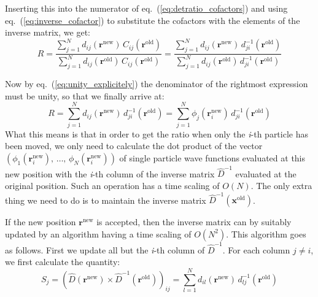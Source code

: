 \documentclass[graybox,sectrefs,envcountresetchap,open=right]{svmonodo}
\begin{document}
Inserting this into the numerator of eq.~(\ref{eq:detratio_cofactors})
and using eq.~(\ref{eq:inverse_cofactor}) to substitute the cofactors
with the elements of the inverse matrix, we get:
\begin{equation}
R =\frac{\sum_{j=1}^N d_{ij}(\mathbf{r}^{\mathrm{new}})\,
C_{ij}(\mathbf{r}^{\mathrm{old}})}
{\sum_{j=1}^N d_{ij}(\mathbf{r}^{\mathrm{old}})\,
C_{ij}(\mathbf{r}^{\mathrm{old}})} =
\frac{\sum_{j=1}^N d_{ij}(\mathbf{r}^{\mathrm{new}})\,
d_{ji}^{-1}(\mathbf{r}^{\mathrm{old}})}
{\sum_{j=1}^N d_{ij}(\mathbf{r}^{\mathrm{old}})\,
d_{ji}^{-1}(\mathbf{r}^{\mathrm{old}})}
\end{equation}







Now by eq.~(\ref{eq:unity_explicitely}) the denominator of the rightmost
expression must be unity, so that we finally arrive at:
\begin{equation}
R =
\sum_{j=1}^N d_{ij}(\mathbf{r}^{\mathrm{new}})\,
d_{ji}^{-1}(\mathbf{r}^{\mathrm{old}}) = 
\sum_{j=1}^N \phi_j(\mathbf{r}_i^{\mathrm{new}})\,
d_{ji}^{-1}(\mathbf{r}^{\mathrm{old}})
\label{eq:detratio_inverse}
\end{equation}
What this means is that in order to get the ratio when only the \emph{i}-th
particle  has been moved, we only need to calculate the dot
product of the vector $\left(\phi_1(\mathbf{r}_i^\mathrm{new}),\,\dots,\,\phi_N(\mathbf{r}_i^\mathrm{new})\right)$ of single particle  wave functions
evaluated at this new position with the \emph{i}-th column of the inverse
matrix $\hat{D}^{-1}$ evaluated at the original position. Such
an operation has a time scaling of $O(N)$. The only extra thing we
need to do is to maintain the inverse matrix $\hat{D}^{-1}(\mathbf{x}^{\mathrm{old}})$.





If the new position $\mathbf{r}^{\mathrm{new}}$ is accepted, then the
inverse matrix can by suitably updated by an algorithm having a time
scaling of $O(N^2)$.  This algorithm goes as
follows. First we update all but the \emph{i}-th column of $\hat{D}^{-1}$. For each column $j\neq i$, we first calculate the quantity:
\begin{equation}
S_j =
(\hat{D}(\mathbf{r}^{\mathrm{new}})\times
\hat{D}^{-1}(\mathbf{r}^{\mathrm{old}}))_{ij} =
\sum_{l=1}^N d_{il}(\mathbf{r}^{\mathrm{new}})\,
d^{-1}_{lj}(\mathbf{r}^{\mathrm{old}})
\label{eq:inverse_update_1}
\end{equation}
\end{document}
